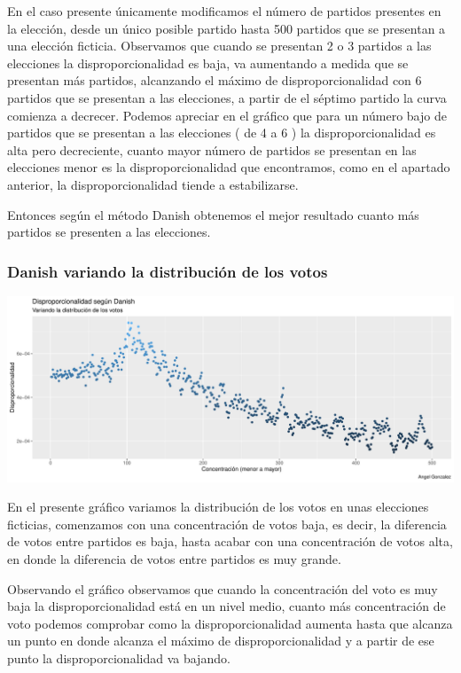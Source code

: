 \documentclass[12pt,a4paper,]{book}
\numberwithin{dummy}{section}
\theoremstyle{ocrenumbox}
\theoremstyle{blacknumex}
\theoremstyle{blacknumbox}
\theoremstyle{ocrenum}
\theoremstyle{ocrenum}
\begin{document}
En el caso presente únicamente modificamos el número de partidos
presentes en la elección, desde un único posible partido hasta 500
partidos que se presentan a una elección ficticia. Observamos que cuando
se presentan 2 o 3 partidos a las elecciones la disproporcionalidad es
baja, va aumentando a medida que se presentan más partidos, alcanzando
el máximo de disproporcionalidad con 6 partidos que se presentan a las
elecciones, a partir de el séptimo partido la curva comienza a decrecer.
Podemos apreciar en el gráfico que para un número bajo de partidos que
se presentan a las elecciones ( de 4 a 6 ) la disproporcionalidad es
alta pero decreciente, cuanto mayor número de partidos se presentan en
las elecciones menor es la disproporcionalidad que encontramos, como en
el apartado anterior, la disproporcionalidad tiende a estabilizarse.

Entonces según el método Danish obtenemos el mejor resultado cuanto más
partidos se presenten a las elecciones.

\hypertarget{danish-variando-la-distribuciuxf3n-de-los-votos}{%
\subsubsection{Danish variando la distribución de los
votos}\label{danish-variando-la-distribuciuxf3n-de-los-votos}}

\begin{center}\includegraphics[width=0.95\linewidth]{figurasR/unnamed-chunk-41-1} \end{center}

En el presente gráfico variamos la distribución de los votos en unas
elecciones ficticias, comenzamos con una concentración de votos baja, es
decir, la diferencia de votos entre partidos es baja, hasta acabar con
una concentración de votos alta, en donde la diferencia de votos entre
partidos es muy grande.

Observando el gráfico observamos que cuando la concentración del voto es
muy baja la disproporcionalidad está en un nivel medio, cuanto más
concentración de voto podemos comprobar como la disproporcionalidad
aumenta hasta que alcanza un punto en donde alcanza el máximo de
disproporcionalidad y a partir de ese punto la disproporcionalidad va
bajando.
\end{document}
